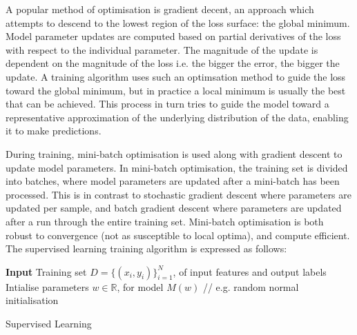 \noindent A popular method of optimisation is gradient decent, an approach which attempts to descend to the lowest region of the loss surface: the global minimum. Model parameter updates are computed based on partial derivatives of the loss with respect to the individual parameter. The magnitude of the update is dependent on the magnitude of the loss i.e. the bigger the error, the bigger the update. A training algorithm uses such an optimsation method to guide the loss toward the global minimum, but in practice a local minimum is usually the best that can be achieved. This process in turn tries to guide the model toward a representative approximation of the underlying distribution of the data, enabling it to make predictions. \par

\noindent During training, mini-batch optimisation is used along with gradient descent to update model parameters. In mini-batch optimisation, the training set is divided into batches, where model parameters are updated after a mini-batch has been processed. This is in contrast to stochastic gradient descent where parameters are updated per sample, and batch gradient descent where parameters are updated after a run through the entire training set. Mini-batch optimisation is both robust to convergence (not as susceptible to local optima), and compute efficient. \newline
The supervised learning training algorithm is expressed as follows: \par 

\bigskip

\begin{algorithm}[H]
	\SetAlgoLined
	\textbf{Input} 
	Training set \begin{math} D = \{(x_i, y_i)\}_{i=1}^N \end{math}, of input features and output labels\;
	Intialise parameters $w \in \mathbb{R}$, for model \begin{math} M(w) \end{math} // e.g. random normal initialisation \\
	\caption{Supervised Learning}
\end{algorithm} \bigbreak



